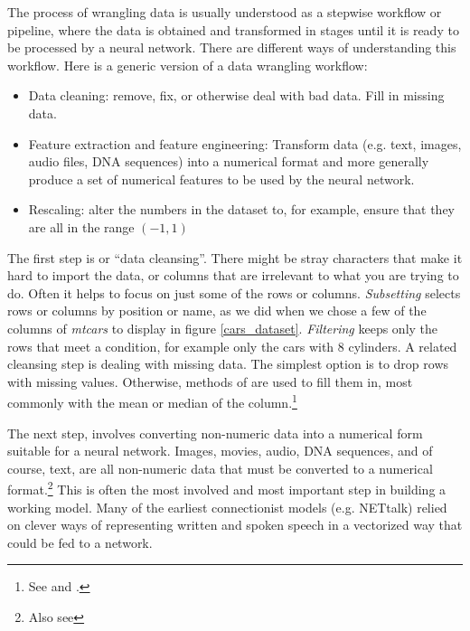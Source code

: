 The process of wrangling data is usually understood as a stepwise workflow or pipeline, where the data is obtained and transformed in stages until it is ready to be processed by a neural network. There are different ways  of understanding this workflow. Here is a generic version of a data wrangling workflow:
\begin{itemize}
\item Data cleaning: remove, fix, or otherwise deal with bad data. Fill in missing data.
\item Feature extraction and feature engineering: Transform data (e.g. text, images, audio files, DNA sequences) into a numerical format and more generally produce a set of numerical features to be used by the neural network.
\item Rescaling: alter the numbers in the dataset to, for example, ensure that they are all in the range $(-1,1)$
\end{itemize}

The first step is  or ``data cleansing''. There might be stray characters that make it hard to import the data, or columns that are irrelevant to what you are trying to do. Often it helps to focus on just some of the rows or columns. \emph{Subsetting} selects rows or columns by position or name, as we did when we chose a few of the columns of \emph{mtcars} to display in figure \ref{cars_dataset}. \emph{Filtering} keeps only the rows that meet a condition, for example only the cars with 8 cylinders. A related cleansing step is dealing with missing data. The simplest option is to drop rows with missing values. Otherwise, methods of  are used to fill them in, most commonly with the mean or median of the column.\footnote{See  and .}

The next step,   involves converting non-numeric data into a numerical form suitable for a neural network. Images, movies, audio, DNA sequences, and of course, text, are all non-numeric data that must be converted to a numerical format.\footnote{Also see } This is often the most involved and  most important step in building a working model. Many of the earliest connectionist models (e.g. NETtalk) relied on clever ways of representing written and spoken speech in a vectorized way that could be fed to a network.

